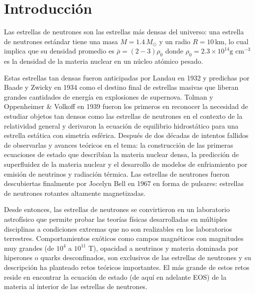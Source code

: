\chapter*{\hspace*{6.5cm}Introducción}

\noindent Las estrellas de neutrones son las estrellas más densas del universo: una estrella de neutrones estándar tiene una masa $M= 1.4\,M_{\odot}$ y un radio $R=10\,\text{km}$, lo cual implica que su densidad promedio es $\bar{\rho}=(2-3)\rho_0$ donde $\rho_{0}=2.3\times 10^{14} \text{g cm}^{-3}$ es la densidad de la materia nuclear en un núcleo atómico pesado. 

Estas estrellas tan densas fueron anticipadas por Landau en 1932 \cite{Yakovlev2013} y predichas por Baade y Zwicky en 1934 \cite{Baade1934} como el destino final de estrellas masivas que liberan grandes cantidades de energía en explosiones de supernova. Tolman y Oppenheimer \& Volkoff en 1939 \cite{Tolman1939,Oppenheimer1939} fueron los primeros en reconocer la necesidad de estudiar objetos tan densos como las estrellas de neutrones en el contexto de la relatividad general y derivaron la ecuación de equilibrio hidrostático para una estrella estática con simetría esférica. Después de dos décadas de intentos fallidos de observarlas y avances teóricos en el tema: la construcción de las primeras ecuaciones de estado que describían la materia nuclear densa, la predicción de superfluidez de la materia nuclear y el desarrollo de modelos de enfriamiento por emisión de neutrinos y radiación térmica. Las estrellas de neutrones fueron descubiertas finalmente por Jocelyn Bell en 1967 \cite{Hewish1968} en forma de pulsares: estrellas de neutrones rotantes altamente magnetizadas.

Desde entonces, las estrellas de neutrones se convirtieron en un laboratorio astrofísico que permite probar las teorías físicas desarrolladas en múltiples disciplinas a condiciones extremas que no son realizables en los laboratorios terrestres. Comportamientos exóticos como campos magnéticos con magnitudes muy grandes (de $10^4$ a $10^{11}$ T), opacidad a neutrinos y materia dominada por hiperones o quarks desconfinados, son exclusivos de las estrellas de neutrones y su descripción ha planteado retos teóricos importantes. El más grande de estos retos reside en encontrar la ecuación de estado (de aquí en adelante EOS) de la materia al interior de las estrellas de neutrones. 

